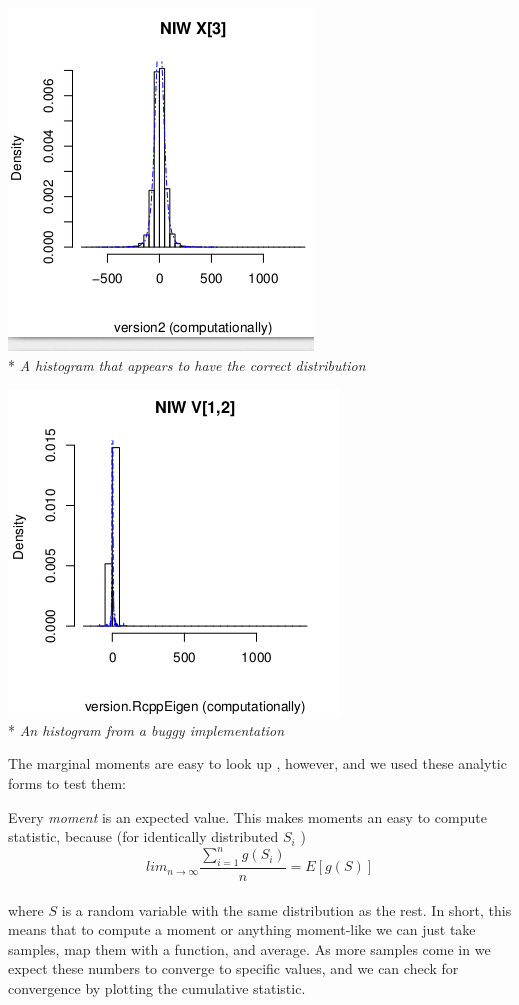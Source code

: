 \documentclass[english]{report}
\begin{document}
\begin{center}
\includegraphics[scale=.8]{densitycorrect.png}\\*
\emph{A histogram that appears to have the correct distribution}
\end{center}

\begin{center}
\includegraphics[scale=.8]{densityincorrect.png}\\*
\emph{An histogram from a buggy implementation}
\\  
\end{center}

The marginal moments are easy to look up \cite{Wikipedia1}, however, and we used these analytic forms to test them:

Every \emph{moment} is an expected value. This makes moments an easy to compute statistic,
 because (for identically distributed $ S_i $ )
$$ lim_{n \rightarrow \infty} \frac{\sum_{i=1}^n g(S_i)}{n} = E[g(S)] $$ \\
where $S$ is a random variable with the same distribution as the rest.
In short, this means that to compute a moment or anything moment-like we can just take samples, map them with a function, and average.
As more samples come in we expect these numbers to converge to specific values, and we can check for convergence by plotting the cumulative statistic.
\end{document}
